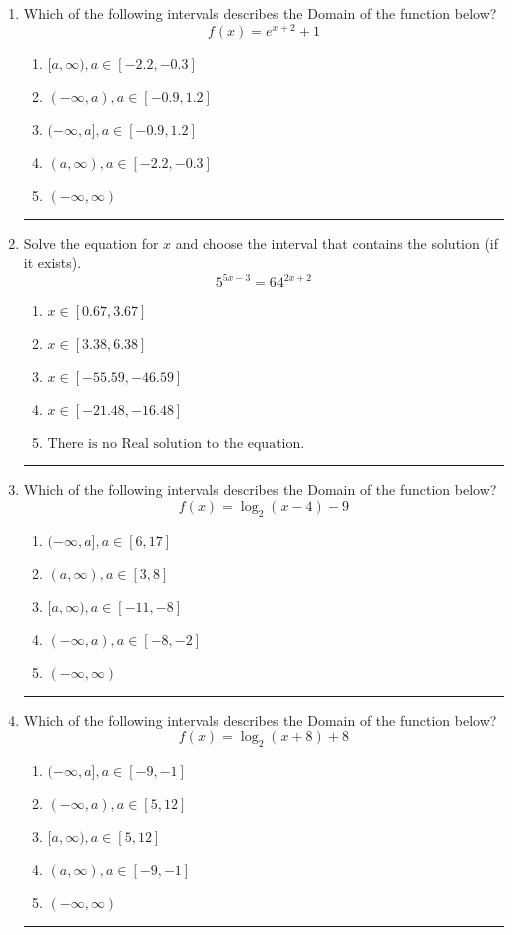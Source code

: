 \documentclass[14pt]{extbook}
\newcommand{\litem}[1]{\item#1\hspace*{-1cm}\rule{\textwidth}{0.4pt}}
\begin{document}
\begin{enumerate}
{\begin{enumerate}[label=\Alph*.]
\end{enumerate} }
\litem{
Which of the following intervals describes the Domain of the function below?\[ f(x) = e^{x+2}+1 \]\begin{enumerate}[label=\Alph*.]
\item \( [a, \infty), a \in [-2.2, -0.3] \)
\item \( (-\infty, a), a \in [-0.9, 1.2] \)
\item \( (-\infty, a], a \in [-0.9, 1.2] \)
\item \( (a, \infty), a \in [-2.2, -0.3] \)
\item \( (-\infty, \infty) \)

\end{enumerate} }
\litem{
Solve the equation for $x$ and choose the interval that contains the solution (if it exists).\[ 5^{5x-3} = 64^{2x+2} \]\begin{enumerate}[label=\Alph*.]
\item \( x \in [0.67, 3.67] \)
\item \( x \in [3.38, 6.38] \)
\item \( x \in [-55.59, -46.59] \)
\item \( x \in [-21.48, -16.48] \)
\item \( \text{There is no Real solution to the equation.} \)

\end{enumerate} }
\litem{
Which of the following intervals describes the Domain of the function below?\[ f(x) = \log_2{(x-4)}-9 \]\begin{enumerate}[label=\Alph*.]
\item \( (-\infty, a], a \in [6, 17] \)
\item \( (a, \infty), a \in [3, 8] \)
\item \( [a, \infty), a \in [-11, -8] \)
\item \( (-\infty, a), a \in [-8, -2] \)
\item \( (-\infty, \infty) \)

\end{enumerate} }
\litem{
Which of the following intervals describes the Domain of the function below?\[ f(x) = \log_2{(x+8)}+8 \]\begin{enumerate}[label=\Alph*.]
\item \( (-\infty, a], a \in [-9, -1] \)
\item \( (-\infty, a), a \in [5, 12] \)
\item \( [a, \infty), a \in [5, 12] \)
\item \( (a, \infty), a \in [-9, -1] \)
\item \( (-\infty, \infty) \)


\end{enumerate}}
\end{enumerate}
\end{document}
